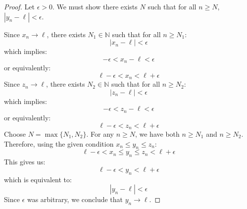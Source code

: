 \documentclass[12pt]{article}
\newcommand{\eps}{\ensuremath{\epsilon}}
\begin{document}
\begin{proof}
Let $\eps > 0$. We must show there exists $N$ such that for all $n \geq N$, $|y_n - \ell| < \eps$.

Since $x_n \to \ell$, there exists $N_1 \in \mathbb{N}$ such that for all $n \geq N_1$:
$$|x_n - \ell| < \eps$$
which implies:
$$-\eps < x_n - \ell < \eps$$
or equivalently:
$$\ell - \eps < x_n < \ell + \eps$$
\newline
Since $z_n \to \ell$, there exists $N_2 \in \mathbb{N}$ such that for all $n \geq N_2$:
$$|z_n - \ell| < \eps$$
which implies:
$$-\eps < z_n - \ell < \eps$$
or equivalently:
$$\ell - \eps < z_n < \ell + \eps$$
\newline
Choose $N = \max\{N_1, N_2\}$. For any $n \geq N$, we have both $n \geq N_1$ and $n \geq N_2$.
\newline
Therefore, using the given condition $x_n \leq y_n \leq z_n$:
$$\ell - \eps < x_n \leq y_n \leq z_n < \ell + \eps$$
\newline
This gives us:
$$\ell - \eps < y_n < \ell + \eps$$
which is equivalent to:
$$|y_n - \ell| < \eps$$
\newline
Since $\eps$ was arbitrary, we conclude that $y_n \to \ell$.
\end{proof}
\end{document}
